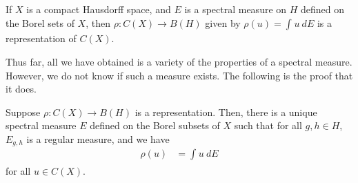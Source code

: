 \documentclass[10pt]{mypackage}
\begin{document}
\begin{corollary}
  If $X$ is a compact Hausdorff space, and $E$ is a spectral measure on $H$ defined on the Borel sets of $X$, then $\rho\colon C(X)\rightarrow B(H)$ given by $ \rho(u) = \int_{}^{} u\:dE $ is a representation of $C(X)$.
\end{corollary}
Thus far, all we have obtained is a variety of the properties of a spectral measure. However, we do not know if such a measure exists. The following is the proof that it does.
\begin{theorem}
  Suppose $\rho\colon C(X)\rightarrow B(H)$ is a representation. Then, there is a unique spectral measure $E$ defined on the Borel subsets of $X$ such that for all $g,h\in H$, $E_{g,h}$ is a regular measure, and we have
  \begin{align*}
    \rho(u) &= \int_{}^{} u\:dE
  \end{align*}
  for all $u\in C(X)$.
\end{theorem}
\end{document}
